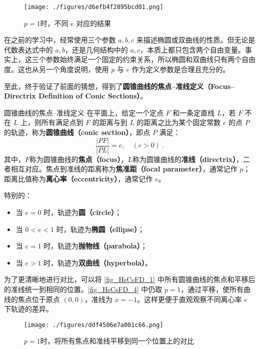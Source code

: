 \begin{figure}[ht]
\centering
\texttt{[image: ./figures/d6efb4f2895bcd01.png]}
\caption{$p = 1$时，不同 $e$ 对应的结果} \label{fig_HsCsFD_1}
\end{figure}

在之前的学习中，经常使用三个参数 $a, b, c$ 来描述椭圆或双曲线的性质。但无论是代数表达式中的 $a, b$，还是几何结构中的 $a, c$，本质上都只包含两个自由变量。事实上，这三个参数始终满足一个固定的约束关系，所以椭圆和双曲线只有两个自由度。这也从另一个角度说明，使用 $p$ 与 $e$ 作为定义参数是合理且充分的。

至此，终于验证了前面的猜想，得到了\textbf{圆锥曲线的焦点–准线定义（Focus–Directrix Definition of Conic Sections）}。

\begin{definition}{圆锥曲线的焦点–准线定义}\label{def_HsCsFD_1}
在平面上，给定一个定点 $F$ 和一条定直线 $L$，若 $F$ 不在 $L$ 上，则所有满足点到 $F$ 的距离与到 $L$ 的距离之比为某个固定常数 $e$ 的点 $P$ 的轨迹，称为\textbf{圆锥曲线（conic section）}，即点 $P$ 满足：
\begin{equation}
\frac{|PF|}{|PL|} = e,\quad(e>0)~.
\end{equation}
其中，$F$称为圆锥曲线的\textbf{焦点（focus）}，$L$称为圆锥曲线的\textbf{准线（directrix）}，二者相互对应。焦点到准线的距离称为\textbf{焦准距（focal parameter）}，通常记作 $p$；距离比值称为\textbf{离心率（eccentricity）}，通常记作 $e$。

特别的：
\begin{itemize}
\item 当 $e = 0$ 时，轨迹为\textbf{圆（circle）}；
\item 当 $0 < e < 1$ 时，轨迹为\textbf{椭圆（ellipse）}；
\item 当 $e = 1$ 时，轨迹为\textbf{抛物线（parabola）}；
\item 当 $e > 1$ 时，轨迹为\textbf{双曲线（hyperbola）}。
\end{itemize}
\end{definition}

为了更清晰地进行对比，可以将 \autoref{fig_HsCsFD_1} 中所有圆锥曲线的焦点和平移后的准线统一到相同的位置。\autoref{fig_HsCsFD_4} 中仍取 $p=1$，通过平移，使所有曲线的焦点位于原点 $(0,0)$，准线为 $x = -1$。这样更便于直观观察不同离心率 $e$ 下轨迹的差异。

\begin{figure}[ht]
\centering
\texttt{[image: ./figures/ddf4506e7a001c66.png]}
\caption{$p=1$时，将所有焦点和准线平移到同一个位置上的对比} \label{fig_HsCsFD_4}
\end{figure}

